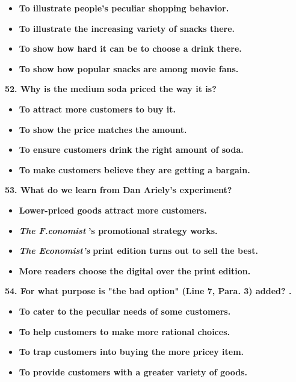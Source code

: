 \documentclass[UTF8,11pt]{ctexart}
\begin{document}
\begin{itemize}[leftmargin=2em,itemsep=.2em,topsep=.4em]\item[A.] \textbf{To illustrate people's peculiar shopping behavior.}
\item[B.] \textbf{To illustrate the increasing variety of snacks there.}
\item[C.] \textbf{To show how hard it can be to choose a drink there.}
\item[D.] \textbf{To show how popular snacks are among movie fans.}
\end{itemize}

\textbf{52. Why is the medium soda priced the way it is?}


\begin{itemize}[leftmargin=2em,itemsep=.2em,topsep=.4em]\item[A.] \textbf{To attract more customers to buy it.}
\item[B.] \textbf{To show the price matches the amount.}
\item[C.] \textbf{To ensure customers drink the right amount of soda.}
\item[D.] \textbf{To make customers believe they are getting a bargain.}
\end{itemize}

\textbf{53. What do we learn from Dan Ariely's experiment?}


\begin{itemize}[leftmargin=2em,itemsep=.2em,topsep=.4em]\item[A.] \textbf{Lower-priced goods attract more customers.}
\item[B.] \textbf{\textit{The F.conomist }}\textbf{'s promotional strategy works.}
\item[C.] \textbf{\textit{The Economist's }}\textbf{print edition turns out to sell the best.}
\item[D.] \textbf{More readers choose the digital over the print edition.}
\end{itemize}

\textbf{54. For what purpose is "the bad option" (Line 7, Para. 3) added? .}


\begin{itemize}[leftmargin=2em,itemsep=.2em,topsep=.4em]\item[A.] \textbf{To cater to the peculiar needs of some customers.}
\item[B.] \textbf{To help customers to make more rational choices.}
\item[C.] \textbf{To\textperiodcentered{} trap customers into buying the more pricey item.}
\item[D.] \textbf{To provide customers with a greater variety of goods.}
\end{itemize}
\end{document}
